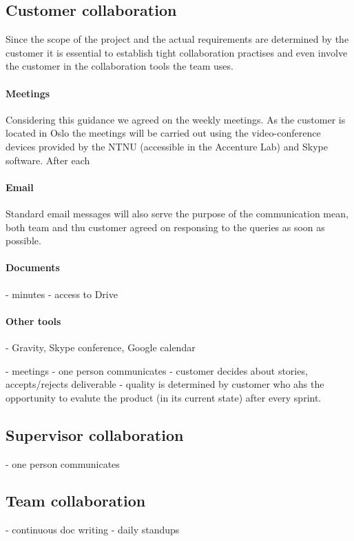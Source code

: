 \documentclass{article}
\begin{document}
\subsection{Customer collaboration}
Since the scope of the project and the actual requirements are determined by the customer it is essential to establish tight collaboration practises and even involve the customer in the collaboration tools the team uses. 

\paragraph{Meetings}
Considering this guidance we agreed on the weekly meetings. As the customer is located in Oslo the meetings will be carried out using the video-conference devices provided by the NTNU (accessible in the Accenture Lab) and Skype software. After each

\paragraph{Email}
Standard email messages will also serve the purpose of the communication mean, both team and thu customer agreed on responsing to the queries as soon as possible. 

\paragraph{Documents}
- minutes
- access to Drive
\paragraph{Other tools}
- Gravity, Skype conference, Google calendar







- meetings
- one person communicates
- customer decides about stories, accepts/rejects deliverable
- quality is determined by customer who ahs the opportunity to evalute the product (in its current state) after every sprint.


\subsection{Supervisor collaboration}
- one person communicates


\subsection{Team collaboration}
- continuous doc writing
- daily standups
\end{document}
